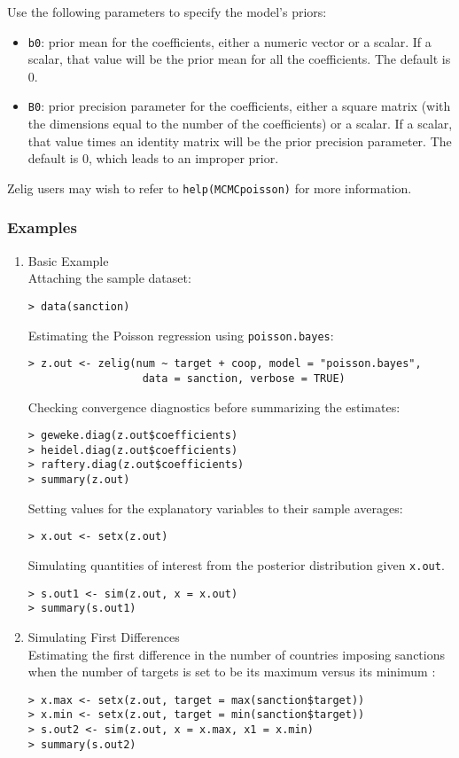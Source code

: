 Use the following parameters to specify the model's priors:  
\begin{itemize}
\item \texttt{b0}: prior mean for the coefficients, either a numeric 
vector or a scalar. If a scalar, that value will be the prior mean for
all the coefficients. The default is 0.

\item \texttt{B0}: prior precision parameter for the coefficients,
either a square matrix (with the dimensions equal to the number of the
coefficients) or a scalar. If a scalar, that value times an identity
matrix will be the prior precision parameter. The default is 0, which
leads to an improper prior.

\end{itemize}

Zelig users may wish to refer to \texttt{help(MCMCpoisson)} for more 
information.



\subsubsection{Examples}

\begin{enumerate}
\item {Basic Example} \\
Attaching the sample  dataset:
\begin{verbatim}
> data(sanction)
\end{verbatim}
Estimating the Poisson regression using \texttt{poisson.bayes}:
\begin{verbatim}
> z.out <- zelig(num ~ target + coop, model = "poisson.bayes",
                  data = sanction, verbose = TRUE)
\end{verbatim}
Checking convergence diagnostics before summarizing the estimates:
\begin{verbatim}
> geweke.diag(z.out$coefficients)
> heidel.diag(z.out$coefficients)
> raftery.diag(z.out$coefficients)
> summary(z.out)
\end{verbatim} %
Setting values for the explanatory variables to their sample averages:
\begin{verbatim}
> x.out <- setx(z.out)
\end{verbatim}
Simulating quantities of interest from the posterior distribution given 
\texttt{x.out}.
\begin{verbatim}
> s.out1 <- sim(z.out, x = x.out)
> summary(s.out1)
\end{verbatim}
\item {Simulating First Differences} \\
Estimating the first difference in the number of countries imposing sanctions
when the number of targets is set to be its maximum versus its minimum :
\begin{verbatim}
> x.max <- setx(z.out, target = max(sanction$target))
> x.min <- setx(z.out, target = min(sanction$target))
> s.out2 <- sim(z.out, x = x.max, x1 = x.min)
> summary(s.out2)
\end{verbatim}
\end{enumerate}

